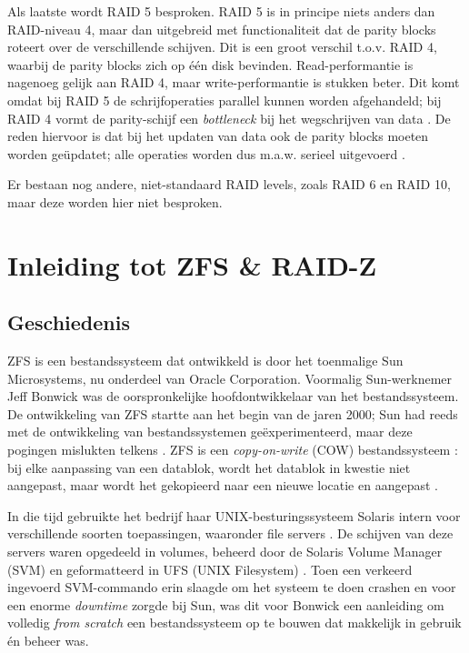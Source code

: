 Als laatste wordt RAID 5 besproken. RAID 5 is in principe niets anders dan RAID-niveau 4, maar dan uitgebreid met functionaliteit dat de parity blocks roteert over de verschillende schijven. Dit is een groot verschil t.o.v. RAID 4, waarbij de parity blocks zich op één disk bevinden. Read-performantie is nagenoeg gelijk aan RAID 4, maar write-performantie is stukken beter. Dit komt omdat bij RAID 5 de schrijfoperaties parallel kunnen worden afgehandeld; bij RAID 4 vormt de parity-schijf een \textit{bottleneck} bij het wegschrijven van data \autocite{Chen1994}. De reden hiervoor is dat bij het updaten van data ook de parity blocks moeten worden geüpdatet; alle operaties worden dus m.a.w. serieel uitgevoerd \autocite{OSThreePiecesRemzi2015}.

Er bestaan nog andere, niet-standaard RAID levels, zoals RAID 6 en RAID 10, maar deze worden hier niet besproken.

\section{Inleiding tot ZFS \& RAID-Z}

\subsection{Geschiedenis}

ZFS is een bestandssysteem dat ontwikkeld is door het toenmalige Sun Microsystems, nu onderdeel van Oracle Corporation. Voormalig Sun-werknemer Jeff Bonwick was de oorspronkelijke hoofdontwikkelaar van het bestandssysteem. De ontwikkeling van ZFS startte aan het begin van de jaren 2000; Sun had reeds met de ontwikkeling van bestandssystemen geëxperimenteerd, maar deze pogingen mislukten telkens \autocite{Bonwick2015}. ZFS is een \textit{copy-on-write} (COW) bestandssysteem \autocite{BrianHickmann2007}: bij elke aanpassing van een datablok, wordt het datablok in kwestie niet aangepast, maar wordt het gekopieerd naar een nieuwe locatie en aangepast \autocite{Lucas2015}.

In die tijd gebruikte het bedrijf haar UNIX-besturingssysteem Solaris intern voor verschillende soorten toepassingen, waaronder file servers \autocite{Bonwick2015}. De schijven van deze servers waren opgedeeld in volumes, beheerd door de Solaris Volume Manager (SVM) en geformatteerd in UFS (UNIX Filesystem) \autocite{Bonwick2015}. Toen een verkeerd ingevoerd SVM-commando erin slaagde om het systeem te doen crashen en voor een enorme \textit{downtime} zorgde bij  Sun, was dit voor Bonwick een aanleiding om volledig \textit{from scratch} een bestandssysteem op te bouwen dat makkelijk in gebruik én beheer was.

